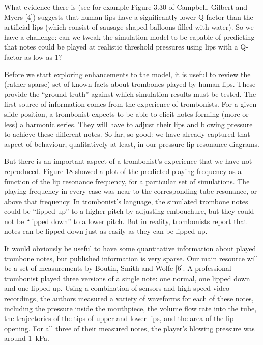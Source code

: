   What evidence there is (see for example Figure 3.30 of Campbell, Gilbert and 
  Myers [4]) suggests that human lips have a significantly lower Q factor than 
  the artificial lips (which consist of sausage-shaped balloons filled with 
  water). So we have a challenge: can we tweak the simulation model to be 
  capable of predicting that notes could be played at realistic threshold 
  pressures using lips with a Q-factor as low as 1? 

  Before we start exploring enhancements to the model, it is useful to review 
  the (rather sparse) set of known facts about trombones played by human lips. 
  These provide the “ground truth” against which simulation results must be 
  tested. The first source of information comes from the experience of 
  trombonists. For a given slide position, a trombonist expects to be able to 
  elicit notes forming (more or less) a harmonic series. They will have to 
  adjust their lips and blowing pressure to achieve these different notes. So 
  far, so good: we have already captured that aspect of behaviour, 
  qualitatively at least, in our pressure-lip resonance diagrams. 

  But there is an important aspect of a trombonist’s experience that we have 
  not reproduced. Figure 18 showed a plot of the predicted playing frequency as 
  a function of the lip resonance frequency, for a particular set of 
  simulations. The playing frequency in every case was near to the 
  corresponding tube resonance, or above that frequency. In trombonist’s 
  language, the simulated trombone notes could be “lipped up” to a higher pitch 
  by adjusting embouchure, but they could not be “lipped down” to a lower 
  pitch. But in reality, trombonists report that notes can be lipped down just 
  as easily as they can be lipped up. 

  It would obviously be useful to have some quantitative information about 
  played trombone notes, but published information is very sparse. Our main 
  resource will be a set of measurements by Boutin, Smith and Wolfe [6]. A 
  professional trombonist played three versions of a single note: one normal, 
  one lipped down and one lipped up. Using a combination of sensors and 
  high-speed video recordings, the authors measured a variety of waveforms for 
  each of these notes, including the pressure inside the mouthpiece, the volume 
  flow rate into the tube, the trajectories of the tips of upper and lower 
  lips, and the area of the lip opening. For all three of their measured notes, 
  the player’s blowing pressure was around 1~kPa. 

